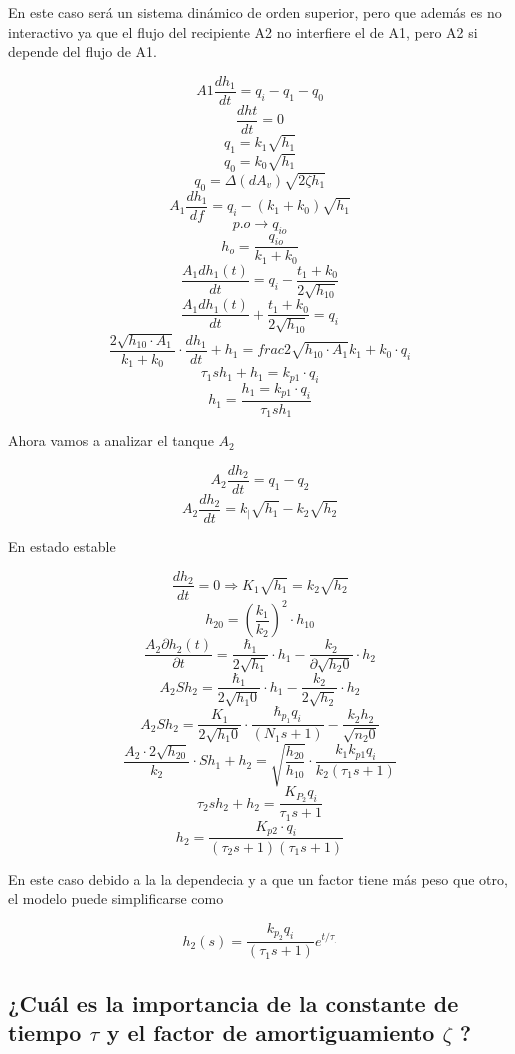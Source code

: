 En este caso será un sistema dinámico de orden superior, pero que además es no interactivo ya que el flujo del recipiente A2 no interfiere el de A1, pero A2 si depende del flujo de A1.

$$ A1 \frac{dh_1}{dt} = q_i-q_1-q_0 $$
$$\frac{dht}{dt}=0$$
$$q_1=k_1 \sqrt{h_1} $$
$$q_0=k_0 \sqrt{h_1} $$
$$q_0= \Delta (dA_v) \sqrt{2 \zeta h_1}  $$
$$A_1 \frac{dh_1}{df}=q_i-(k_1 +k_0) \sqrt{h_1} $$
$$p.o \rightarrow q_{io} $$
$$h_o=\frac{q_{io}}{k_1 +k_0}  $$
$$\frac{A_1 dh_1(t)}{dt}=q_i - \frac{t_1 + k_0}{2\sqrt{h_{10}}} $$
$$\frac{A_1 dh_1(t)}{dt} +\frac{t_1 + k_0}{2\sqrt{h_{10}}} =q_i $$
$$\frac{2 \sqrt{h_{10} \cdot A_1}}{k_1 + k_0} \cdot \frac{dh_1}{dt} + h_1 = frac{2 \sqrt{h_{10} \cdot A_1}}{k_1 + k_0} \cdot q_i$$
$$\tau_1 sh_1 + h_1=k_{p1} \cdot q_i $$
$$h_1 = \frac{h_1=k_{p1} \cdot q_i}{\tau_1 sh_1}$$

Ahora vamos a analizar el tanque $ A_2 $

$$A_2 \frac{dh_2}{dt}=q_1 - q_2 $$
$$A_2 \frac{dh_2}{dt}= k_| \sqrt{h_1} - k_2 \sqrt{h_2}$$

En estado estable

$$\frac{dh_2}{dt}=0 \Rightarrow K_1 \sqrt{h_1} =k_2 \sqrt{h_2} $$
$$h_{20} = (\frac{k_1}{k_2})^{2} \cdot h_{10} $$
$$
\frac{A_{2} \partial h_{2}(t)}{\partial t}=\frac{\hbar_{1}}{2 \sqrt{h_{1}}} \cdot h_{1}-\frac{k_{2}}{\partial \sqrt{h_{2} 0}} \cdot h_{2}
$$
$$
A_{2} S h_{2}=\frac{\hbar_{1}}{2 \sqrt{h_{1} 0}} \cdot h_{1}-\frac{k_{2}}{2 \sqrt{h_{2}}} \cdot h_{2}
$$
$$
A_{2} S h_{2}=\frac{K_{1}}{2 \sqrt{h_{1} 0}} \cdot \frac{\hbar_{p_{1}} q_{i}}{\left(N_{1} s+1\right)}-\frac{k_{2} h_{2}}{\sqrt{n_{2} 0}}
$$
$$\frac{A_2 \cdot 2 \sqrt{h_{20}}}{k_2} \cdot Sh_1 + h_2 = \sqrt{\frac{h_{20}}{h_{10}}} \cdot \frac{k_1 k_{p1} q_i}{k_2 (\tau_1 s +1)} $$
$$
\tau_{2} s h_{2}+h_{2}=\frac{K_{P_{2}} q_{i}}{\tau_{1} s+1}
$$
$$h_2= \frac{K_{p2} \cdot q_i}{(\tau_2 s +1) (\tau_1 s +1)}$$

En este caso debido a la la dependecia y a que un factor tiene más peso que otro, el modelo puede simplificarse como

\begin{equation}
	h_{2}(s)=\frac{k_{p_{2}} q_{i}}{\left(\tau_{1} s+1\right)} e^{t / \tau_{.}}
\end{equation} 

\subsection{¿Cuál es la importancia de la constante de tiempo $\tau$ y el factor de amortiguamiento $\zeta$ ?}

